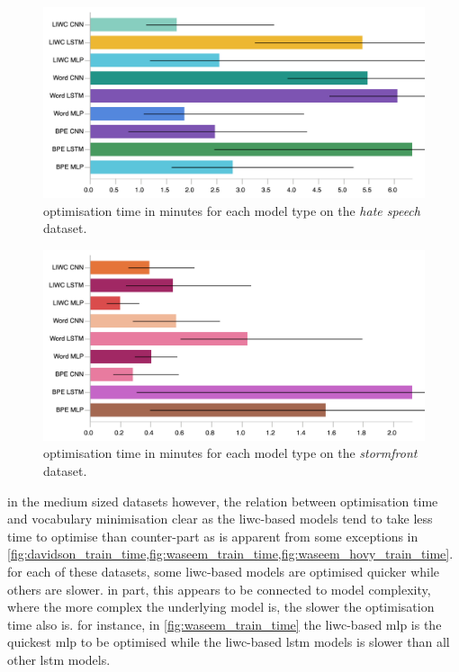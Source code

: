 \begin{figure}[h]
    \centering
    \includegraphics[width=\textwidth]{waseem_hovy_train_time.pdf}
    \caption{optimisation time in minutes for each model type on the \textit{hate speech} dataset.}
    \label{fig:waseem_hovy_train_time}
\end{figure}
\begin{figure}[h]
  \centering
  \includegraphics[width=\textwidth]{garcia_train_time.pdf}
  \caption{optimisation time in minutes for each model type on the \textit{stormfront} dataset.}
  \label{fig:garcia_train_time}
\end{figure}

in the medium sized datasets however, the relation between optimisation time and vocabulary minimisation clear as the liwc-based models tend to take less time to optimise than counter-part as is apparent from some exceptions in \cref{fig:davidson_train_time,fig:waseem_train_time,fig:waseem_hovy_train_time}.
for each of these datasets, some liwc-based models are optimised quicker while others are slower. 
in part, this appears to be connected to model complexity, where the more complex the underlying model is, the slower the optimisation time also is.
for instance, in  \cref{fig:waseem_train_time} the liwc-based mlp is the quickest mlp to be optimised while the liwc-based lstm models is slower than all other lstm models.

